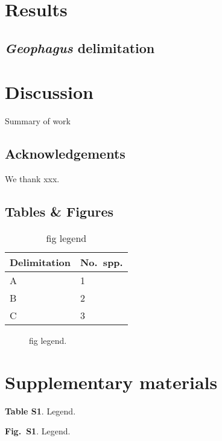\documentclass[12pt]{article}
\begin{document}
\section*{Results}

\subsection*{\emph{Geophagus} delimitation}


\section*{Discussion}

Summary of work

\subsection*{Acknowledgements}

We thank xxx.%




\newpage
\subsection*{Tables \& Figures}

\begin{table}[htbp]
\scriptsize
\caption{fig legend}
\begin{tabular}{ll}
\toprule
Delimitation & No.\ spp.\\
\midrule
A & 1 \\
B & 2 \\
C & 3 \\
\bottomrule
\end{tabular}
\label{tab:xxx}
\end{table}


\newpage

\begin{figure}[!htbp]
\caption{fig legend.}
\begin{center}
\end{center}
\label{fig:xxx}
\end{figure}



\newpage
\section*{Supplementary materials}

\noindent \textbf{Table S1}. Legend.%
\bigskip

\noindent \textbf{Fig.\ S1}. Legend.%
\bigskip

\newpage 

\clearpage
\end{document}
